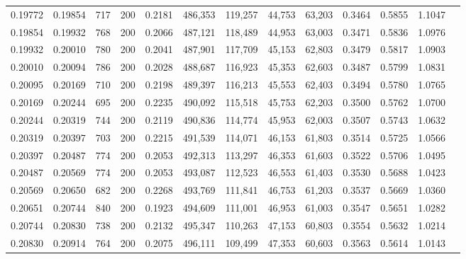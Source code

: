 \begin{tabular}{rrrrrrrrrrrrr}
0.19772 & 0.19854 &    717 & 200 &                                     0.2181 & 486,353 & 119,257 &  44,753 &  63,203 & 0.3464 & 0.5855 & 1.1047 \\
0.19854 & 0.19932 &    768 & 200 &                                     0.2066 & 487,121 & 118,489 &  44,953 &  63,003 & 0.3471 & 0.5836 & 1.0976 \\
0.19932 & 0.20010 &    780 & 200 &                                     0.2041 & 487,901 & 117,709 &  45,153 &  62,803 & 0.3479 & 0.5817 & 1.0903 \\
0.20010 & 0.20094 &    786 & 200 &                                     0.2028 & 488,687 & 116,923 &  45,353 &  62,603 & 0.3487 & 0.5799 & 1.0831 \\
0.20095 & 0.20169 &    710 & 200 &                                     0.2198 & 489,397 & 116,213 &  45,553 &  62,403 & 0.3494 & 0.5780 & 1.0765 \\
0.20169 & 0.20244 &    695 & 200 &                                     0.2235 & 490,092 & 115,518 &  45,753 &  62,203 & 0.3500 & 0.5762 & 1.0700 \\
0.20244 & 0.20319 &    744 & 200 &                                     0.2119 & 490,836 & 114,774 &  45,953 &  62,003 & 0.3507 & 0.5743 & 1.0632 \\
0.20319 & 0.20397 &    703 & 200 &                                     0.2215 & 491,539 & 114,071 &  46,153 &  61,803 & 0.3514 & 0.5725 & 1.0566 \\
0.20397 & 0.20487 &    774 & 200 &                                     0.2053 & 492,313 & 113,297 &  46,353 &  61,603 & 0.3522 & 0.5706 & 1.0495 \\
0.20487 & 0.20569 &    774 & 200 &                                     0.2053 & 493,087 & 112,523 &  46,553 &  61,403 & 0.3530 & 0.5688 & 1.0423 \\
0.20569 & 0.20650 &    682 & 200 &                                     0.2268 & 493,769 & 111,841 &  46,753 &  61,203 & 0.3537 & 0.5669 & 1.0360 \\
0.20651 & 0.20744 &    840 & 200 &                                     0.1923 & 494,609 & 111,001 &  46,953 &  61,003 & 0.3547 & 0.5651 & 1.0282 \\
0.20744 & 0.20830 &    738 & 200 &                                     0.2132 & 495,347 & 110,263 &  47,153 &  60,803 & 0.3554 & 0.5632 & 1.0214 \\
0.20830 & 0.20914 &    764 & 200 &                                     0.2075 & 496,111 & 109,499 &  47,353 &  60,603 & 0.3563 & 0.5614 & 1.0143 \\

\end{tabular}
